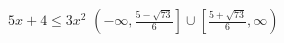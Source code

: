 {$5x+4 \leq 3x^2$}
{$\left(-\infty, \frac{5 - \sqrt{73}}{6} \right] \cup \left[\frac{5 + \sqrt{73}}{6}, \infty \right)$}